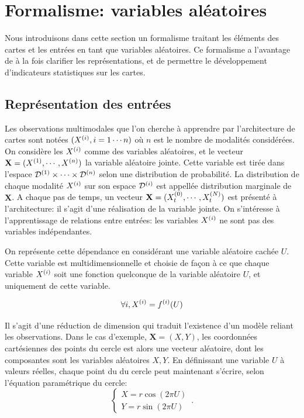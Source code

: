 \section{Formalisme: variables aléatoires}

Nous introduisons dans cette section un formalisme traitant les éléments des cartes et les entrées en tant que variables aléatoires. Ce formalisme a l'avantage de à la fois clarifier les représentations, et de permettre le développement d'indicateurs statistiques sur les cartes.

\subsection{Représentation des entrées}

Les observations multimodales que l'on cherche à apprendre par l'architecture de cartes sont notées $(X^{({i})}, i = 1 \cdots n)$ où $n$ est le nombre de modalités considérées. On considère les $X^{({i})}$ comme des variables aléatoires, et le vecteur $\mathbf{X} = (X^{({1})}, \cdots, X^{({n})})$ la variable aléatoire jointe. Cette variable est tirée dans l'espace $\mathcal{D}^{({1})} \times \cdots \times \mathcal{D}^{({n})}$ selon une distribution de probabilité. La distribution de chaque modalité $X^{({i})}$ sur son espace $\mathcal{D}^{({i})}$ est appellée distribution marginale de $\mathbf{X}$.
A chaque pas de temps, un vecteur $\mathbf{X} = (X^{({0})}_t, \cdots , X^{({N})}_t)$ est présenté à l'architecture: il s'agit d'une réalisation de la variable jointe. On s'intéresse à l'apprentissage de relations entre entrées: les variables $X^{({i})}$ ne sont pas des variables indépendantes.

On représente cette dépendance en considérant une variable aléatoire cachée $U$. Cette variable est multidimensionnelle et choisie de façon à ce que chaque variable $X^{({i})}$ soit une fonction quelconque de la variable aléatoire $U$, et uniquement de cette variable.

\begin{equation}
\forall i, X^{({i})} = f^{({i})}(U)
\label{eq:U}
\end{equation}

Il s'agit d'une réduction de dimension qui traduit l'existence d'un modèle reliant les observations.
Dans le cas d'exemple, $\mathbf{X} = (X,Y)$, les coordonnées cartésiennes des points du cercle est alors une vecteur aléatoire, dont les composantes sont les variables aléatoires $X,Y$. En définissant une variable $U$ à valeurs réelles, chaque point du du cercle peut maintenant s'écrire, selon l'équation paramétrique du cercle:
\begin{equation}
 \begin{cases}
     X = r  \cos(2\pi U)\\
     Y = r \sin(2 \pi U)
    \end{cases}\,.
\end{equation}

